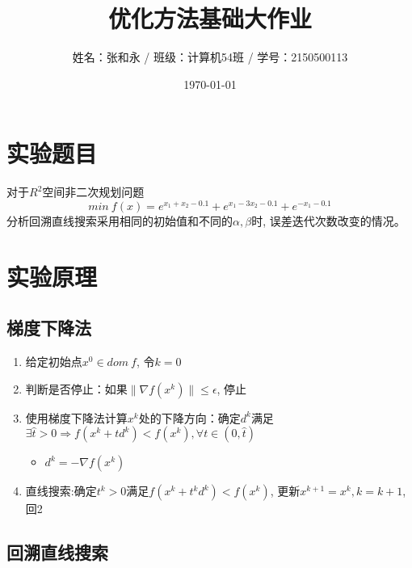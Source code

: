\documentclass[12pt,a4paper,UTF-8]{article}
\title{ 优化方法基础大作业 }
\author{姓名：张和永 / 班级：计算机54班 / 学号：2150500113}
\date{\today}
\begin{document}
\maketitle
\setcounter{tocdepth}{4}
\tableofcontents
\newpage
\section{实验题目}

对于$R^2$空间非二次规划问题$$min\ f(x) = e^{x_1 + x_2 - 0.1} + e^{x_1 - 3x_2 -0.1} + e^{-x_1 - 0.1}$$分析回溯直线搜索采用相同的初始值和不同的$\alpha, \beta$时, 误差迭代次数改变的情况。

\section{实验原理}

\subsection{梯度下降法}

\begin{enumerate}

	\item 给定初始点$x^0 \in dom\ f$, 令$k=0$ 

	\item 判断是否停止：如果$\lVert \nabla f(x^k) \rVert \leq \epsilon$, 停止 

	\item 使用梯度下降法计算$x^k$处的下降方向：确定$d^k$满足$\exists \hat{t} > 0 \Rightarrow f(x^k + t d^k) < f(x^k), \forall t \in (0, \hat{t})$

	\begin{itemize}

		\item[] $d^k = -\nabla f(x^k) $

	\end{itemize}

	\item 直线搜索:确定$t^k > 0$满足$f(x^k + t^k d^k) < f(x^k)$, 更新$x^{k+1} = x^k, k = k + 1$, 回2


\end{enumerate}


\subsection{回溯直线搜索}
\end{document}
